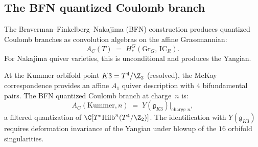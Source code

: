\subsection{The BFN quantized Coulomb branch}
\label{subsec:k3e-bfn}

The Braverman--Finkelberg--Nakajima (BFN) construction produces quantized Coulomb branches as convolution algebras on the affine Grassmannian:
\[
 A_C(T) \;=\; H^G_*(\mathrm{Gr}_G,\, \mathrm{IC}_R).
\]
For Nakajima quiver varieties, this is unconditional and produces the Yangian.

\begin{conjecture}[BFN = K3 Yangian, Kummer-orbifold form]
\label{conj:bfn-k3-yangian-kummer}
\ClaimStatusConjectured
At the Kummer orbifold point $K3 = T^4/\Z_2$ (resolved), the McKay correspondence provides an affine $A_1$ quiver description with $4$ bifundamental pairs. The BFN quantized Coulomb branch at charge~$n$ is:
\[
 A_C(\text{Kummer}, n) \;=\; Y(\mathfrak{g}_{K3})\big|_{\text{charge } n},
\]
a filtered quantization of $\C[T^*\!\operatorname{Hilb}^n(T^4/\Z_2)]$. The identification with $Y(\mathfrak{g}_{K3})$ requires deformation invariance of the Yangian under blowup of the $16$ orbifold singularities.
\end{conjecture}

